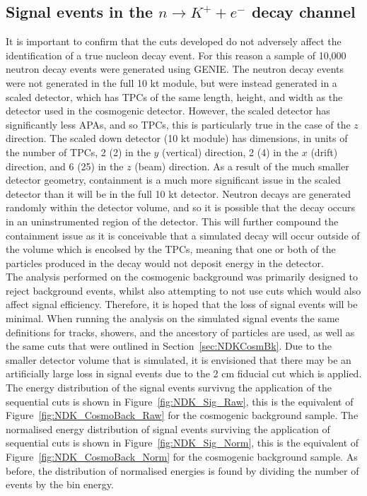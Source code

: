 \subsection{Signal events in the $n \rightarrow K^{+} + e^{-}$ decay channel} \label{sec:NDKSig}
It is important to confirm that the cuts developed do not adversely affect the identification of a true nucleon decay event. For this reason a sample of 10,000 neutron decay events were generated using GENIE. The neutron decay events were not generated in the full 10 kt module, but were instead generated in a scaled detector, which has TPCs of the same length, height, and width as the detector used in the cosmogenic detector. However, the scaled detector has significantly less APAs, and so TPCs, this is particularly true in the case of the $z$ direction. The scaled down detector (10 kt module) has dimensions, in units of the number of TPCs, 2 (2) in the $y$ (vertical) direction, 2 (4) in the $x$ (drift) direction, and 6 (25) in the $z$ (beam) direction. As a result of the much smaller detector geometry, containment is a much more significant issue in the scaled detector than it will be in the full 10 kt detector. Neutron decays are generated randomly within the detector volume, and so it is possible that the decay occurs in an uninstrumented region of the detector. This will further compound the containment issue as it is conceivable that a simulated decay will occur outside of the volume which is encolsed by the TPCs, meaning that one or both of the particles produced in the decay would not deposit energy in the detector. \\

The analysis performed on the cosmogenic background was primarily designed to reject background events, whilst also attempting to not use cuts which would also affect signal efficiency. Therefore, it is hoped that the loss of signal events will be minimal. When running the analysis on the simulated signal events the same definitions for tracks, showers, and the ancestory of particles are used, as well as the same cuts that were outlined in Section~\ref{sec:NDKCosmBk}. Due to the smaller detector volume that is simulated, it is envisioned that there may be an artificially large loss in signal events due to the 2 cm fiducial cut which is applied. \\

The energy distribution of the signal events survivng the application of the sequential cuts is shown in Figure~\ref{fig:NDK_Sig_Raw}, this is the equivalent of Figure~\ref{fig:NDK_CosmoBack_Raw} for the cosmogenic background sample. The normalised energy distribution of signal events surviving the application of sequential cuts is shown in Figure~\ref{fig:NDK_Sig_Norm}, this is the equivalent of Figure~\ref{fig:NDK_CosmoBack_Norm} for the cosmogenic background sample. As before, the distribution of normalised energies is found by dividing the number of events by the bin energy. \\

